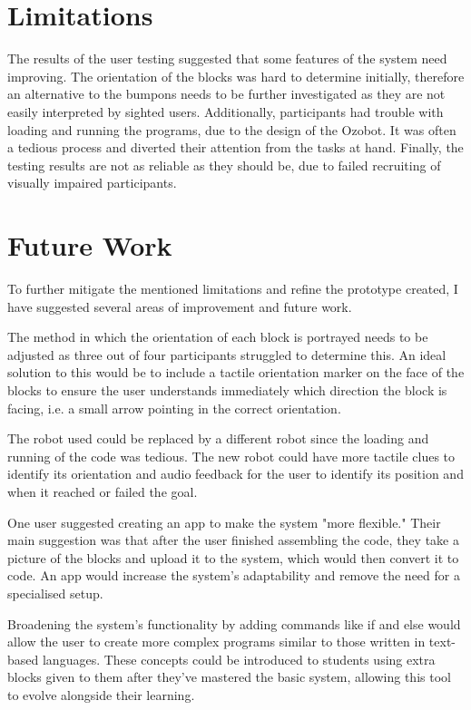 \documentclass[oneside,%
                    author={Malak Hajji},
                    degree={BSc},
                    title={Designing An Accessible Ozobot Programming Platform for Students},
                  subtitle={With Mixed Visual Abilities}]{dissertation}
\begin{document}
\section{Limitations}
The results of the user testing suggested that some features of the system need improving. The orientation of the blocks was hard to determine initially, therefore an alternative to the bumpons needs to be further investigated as they are not easily interpreted by sighted users.
Additionally, participants had trouble with loading and running the programs, due to the design of the Ozobot. It was often a tedious process and diverted their attention from the tasks at hand.
Finally, the testing results are not as reliable as they should be, due to failed recruiting of visually impaired participants. 


\section{Future Work}
To further mitigate the mentioned limitations and refine the prototype created, I have suggested several areas of improvement and future work.

The method in which the orientation of each block is portrayed needs to be adjusted as three out of four participants struggled to determine this. An ideal solution to this would be to include a tactile orientation marker on the face of the blocks to ensure the user understands immediately which direction the block is facing, i.e. a small arrow pointing in the correct orientation.


The robot used could be replaced by a different robot since the loading and running of the code was tedious. The new robot could have more tactile clues to identify its orientation and audio feedback for the user to identify its position and when it reached or failed the goal.  

One user suggested creating an app to make the system "more flexible." Their main suggestion was that after the user finished assembling the code, they take a picture of the blocks and upload it to the system, which would then convert it to code. An app would increase the system's adaptability and remove the need for a specialised setup.


Broadening the system's functionality by adding commands like if and else would allow the user to create more complex programs similar to those written in text-based languages. These concepts could be introduced to students using extra blocks given to them after they've mastered the basic system, allowing this tool to evolve alongside their learning.
\end{document}
